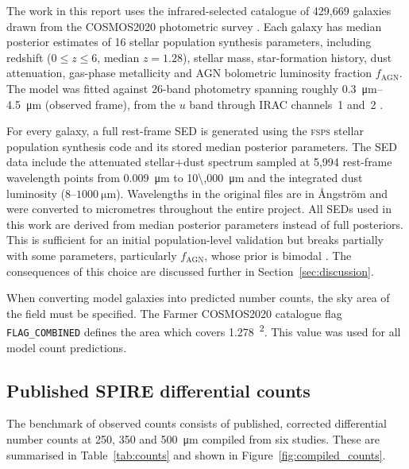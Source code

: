 \documentclass[12pt,a4paper]{article}
\begin{document}
The work in this report uses the infrared-selected \popcosmos{} catalogue of 429,669
galaxies drawn from the COSMOS2020 photometric survey
\citep{Thorp_2025_insights}. Each galaxy has
median posterior estimates of 16 stellar population synthesis parameters, including
redshift ($0 \leq z \leq 6$, median $z = 1.28$), stellar mass, star-formation history,
dust attenuation, gas-phase metallicity and AGN bolometric luminosity fraction
$f_\mathrm{AGN}$. The model was fitted against 26-band photometry spanning roughly
\SIrange{0.3}{4.5}{\um} (observed frame), from the $u$ band through IRAC channels~1
and~2 \citep{Thorp_2025_insights}.

For every galaxy, a full rest-frame SED is generated using the \textsc{fsps} stellar
population synthesis code and its stored median posterior parameters. The SED data include
the attenuated stellar$+$dust spectrum sampled at 5,994 rest-frame wavelength points from
\SI{0.009}{\um} to \SI{10\,000}{\um} and the integrated dust luminosity
\LIR{} ($8$--$\SI{1000}{\um}$). Wavelengths in the original files are in \AA ngstr\"om
and were converted to micrometres throughout the entire project. All SEDs used in this work are derived from median posterior parameters instead of full posteriors. This is sufficient
for an initial population-level validation but breaks partially with some
parameters, particularly $f_\mathrm{AGN}$, whose prior is bimodal
\citep{Thorp_2025_insights}. The consequences of this choice are discussed further in
Section~\ref{sec:discussion}.

When converting model galaxies into predicted number counts, the sky area of
the field must be specified. The Farmer COSMOS2020 catalogue flag
\texttt{FLAG\_COMBINED} defines the area which covers
\SI{1.278}{\deg\squared}. This value was used for all model count predictions.

\subsection{Published SPIRE differential counts}
\label{sec:data:counts}

The benchmark of observed counts consists of published, corrected differential
number counts at 250, 350 and \SI{500}{\um} compiled from six studies. These are
summarised in Table~\ref{tab:counts} and shown in Figure~\ref{fig:compiled_counts}.
\end{document}
